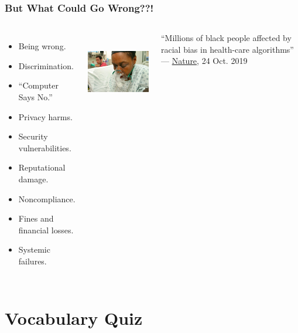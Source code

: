 \documentclass[11pt,
               aspectratio=169,
               hyperref={colorlinks}
               ]{beamer}
\begin{document}
	\begin{frame}
		
		\frametitle{But What Could Go Wrong??!}
		
		\begin{columns}		
		
		
			\begin{itemize}
				\item Being wrong.
				\item Discrimination.
				\item ``Computer Says No.''
				\item Privacy harms.
				\item Security vulnerabilities.
				\item Reputational damage.
				\item Noncompliance.
				\item Fines and financial losses.
				\item Systemic failures.
			\end{itemize}
		
			\begin{center}
			\includegraphics[height=100pt]{img/nature.jpg}
			\end{center}
			\vspace{10pt}
			“Millions of black people affected by racial bias in health-care algorithms”\\ --- \href{https://www.nature.com/articles/d41586-019-03228-6}{Nature}, 24 Oct. 2019

		\end{columns}	
				
	\end{frame}
	

	\section{Vocabulary Quiz}
\end{document}
